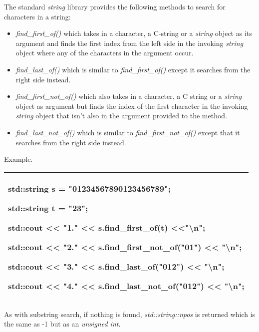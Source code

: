\documentclass[
]{article}
\providecommand{\tightlist}{%
  \setlength{\itemsep}{0pt}\setlength{\parskip}{0pt}}
\begin{document}
The standard \emph{string} library provides the following methods to
search for characters in a string:

\begin{itemize}
\tightlist
\item
  \emph{find\_first\_of()} which takes in a character, a C-string or a
  \emph{string} object as its argument and finds the first index from
  the left side in the invoking \emph{string} object where any of the
  characters in the argument occur.
\item
  \emph{find\_last\_of()} which is similar to \emph{find\_first\_of()}
  except it searches from the right side instead.
\item
  \emph{find\_first\_not\_of()} which also takes in a character, a C
  string or a \emph{string} object as argument but finds the index of
  the first character in the invoking \emph{string} object that isn't
  also in the argument provided to the method.
\item
  \emph{find\_last\_not\_of()} which is similar to
  \emph{find\_first\_not\_of()} except that it searches from the right
  side instead.
\end{itemize}

Example.

\begin{longtable}[]{@{}l@{}}
\toprule
\endhead
\begin{minipage}[t]{0.97\columnwidth}\raggedright
std::string s = "01234567890123456789";

std::string t = "23";

std::cout \textless\textless{} "1." \textless\textless{}
s.find\_first\_of(t) \textless\textless"\textbackslash n";

std::cout \textless\textless{} "2." \textless\textless{}
s.find\_first\_not\_of("01") \textless\textless{} "\textbackslash n";

std::cout \textless\textless{} "3." \textless\textless{}
s.find\_last\_of("012") \textless\textless{} "\textbackslash n";

std::cout \textless\textless{} "4." \textless\textless{}
s.find\_last\_not\_of("012") \textless\textless{}
"\textbackslash n";\strut
\end{minipage}\tabularnewline
\bottomrule
\end{longtable}

As with substring search, if nothing is found, \emph{std::string::npos}
is returned which is the same as -1 but as an \emph{unsigned int}.
\end{document}

